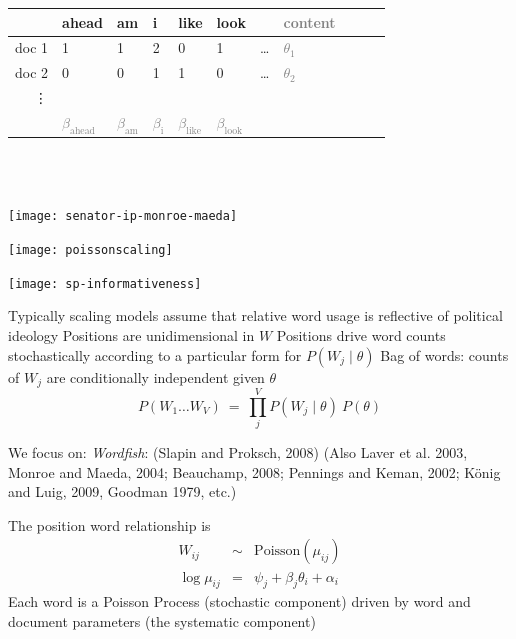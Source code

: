 \documentclass{mediumfoils}
\begin{document}
\begin{center}
\small
\begin{tabular}{rllllllllll}\toprule
        & ahead & am & i & like & look &  & \textcolor{gray}{content} \\ \midrule
doc 1  & 1     & 1   & 2 & 0    & 1    & \ldots & \textcolor{gray}{$\theta_1$} \\
doc 2  & 0     & 0   & 1 & 1    & 0    & \ldots & \textcolor{gray}{$\theta_2$} \\ 
\vdots \\
&
\textcolor{gray}{$\beta_\text{ahead}$} &
\textcolor{gray}{$\beta_\text{am}$} &
\textcolor{gray}{$\beta_\text{i}$} & 
\textcolor{gray}{$\beta_\text{like}$} & 
\textcolor{gray}{$\beta_\text{look}$}\\
\bottomrule

\end{tabular} 
\normalsize
\end{center}
~\\\


\centerline{\texttt{[image: senator-ip-monroe-maeda]}}




\centerline{\texttt{[image: poissonscaling]}}

\newpage
\centerline{\texttt{[image: sp-informativeness]}}



Typically scaling models assume that
\ita
\itm relative word usage is reflective of political ideology
\itm Positions are unidimensional in $W$ 
\itm Positions drive word counts stochastically according to a particular form for $P(W_{j} \mid \theta)$
\itm Bag of words: counts of $W_{j}$ are conditionally independent given $\theta$
\[
P(W_{1}\ldots W_{V}) ~=~ \prod^{V}_{j} P(W_{j} \mid \theta)~ P(\theta)
\] 
\itz 


We focus on:
\ita
\itm \textit{Wordfish}: (Slapin and Proksch, 2008)
\itm (Also Laver et al. 2003, Monroe and Maeda, 2004; Beauchamp, 2008; Pennings and Keman, 2002; K\"{o}nig and Luig, 2009, Goodman 1979, etc.)
\itz



The position word relationship is
\begin{eqnarray*}
W_{ij} &\sim& \text{Poisson}(\mu_{ij})\\
\log \mu_{ij} &=& \psi_{j} + \beta_{j}\theta_{i} +  \alpha_{i} 
\end{eqnarray*}
Each word is a Poisson Process (stochastic component) driven by word and document parameters (the systematic component)
\end{document}
